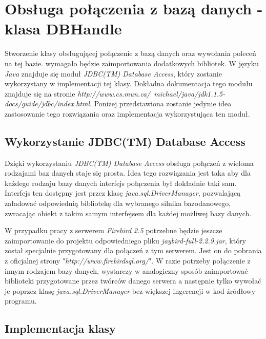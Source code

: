 \section{Obsługa połączenia z bazą danych - klasa DBHandle}

Stworzenie klasy obsługującej połączenie z bazą danych oraz wywołania poleceń na tej bazie. wymagało będzie zaimportowania dodatkowych bibliotek. W języku \emph{Java} znajduje się moduł \emph{ JDBC(TM) Database Access}, który zostanie wykorzystany w implementacji tej klasy. Dokładna dokumentacja tego modułu znajduje się na stronie \emph{http://www.cs.mun.ca/~michael/java/jdk1.1.5-docs/guide/jdbc/index.html}. Poniżej przedstawiona zostanie jedynie idea zastosowanie tego rozwiązania oraz implementacja wykorzystująca ten moduł.
\subsection{Wykorzystanie JDBC(TM) Database Access}

Dzięki wykorzystaniu \emph{ JDBC(TM) Database Access} obsługa połączeń z wieloma rodzajami baz danych staje się prosta. Idea tego rozwiązania jest taka aby dla każdego rodzaju bazy danych interfejs połączenia był dokładnie taki sam. Interfejs ten dostępny jest przez klasę \emph{java.sql.DriverManager}, pozwalającą załadować odpowiednią bibliotekę dla wybranego silnika bazodanowego, zwracając obiekt z takim samym interfejsem dla każdej możliwej bazy danych. 
\par
W przypadku pracy z serwerem \emph{Firebird 2.5} potrzebne będzie jeszcze zaimportowanie do projektu odpowiedniego pliku \emph{jaybird-full-2.2.9.jar}, który został specjalnie przygotowany dla połączeń z tym serwerem. Jest on do pobrania z oficjalnej strony "\emph{http://www.firebirdsql.org/}". W razie potrzeby połączenie z innym rodzajem bazy danych, wystarczy w analogiczny sposób zaimportować biblioteki przygotowane przez twórców danego serwera a następnie tylko wywołać je poprzez klasę \emph{java.sql.DriverManager} bez większej ingerencji w kod źródłowy programu.

\subsection{Implementacja klasy}

